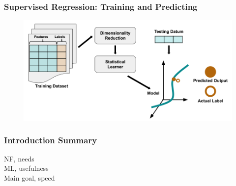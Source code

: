 \begin{frame}
  \frametitle{Supervised Regression: Training and Predicting}
  \begin{figure}
    \centering
    \includegraphics[width=\textwidth]{./figures/SupervisedRegression.png}
  \end{figure}
\end{frame}

\begin{frame}
  \frametitle{Introduction Summary}
  NF, needs\\
  ML, usefulness\\
  Main goal, speed
\end{frame}


